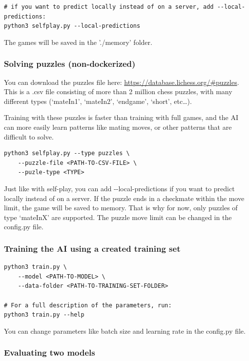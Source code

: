 \documentclass{article}
\begin{document}
\begin{verbatim}
# if you want to predict locally instead of on a server, add --local-predictions:
python3 selfplay.py --local-predictions
\end{verbatim}

The games will be saved in the './memory' folder.

\subsubsection{Solving puzzles (non-dockerized)}

You can download the puzzles file here: \url{https://database.lichess.org/#puzzles}.
This is a .csv file consisting of more than 2 million chess puzzles, 
with many different types (`mateIn1', `mateIn2', `endgame', `short', etc\dots).

Training with these puzzles is faster than training with full games, and the AI can
more easily learn patterns like mating moves, or other patterns that are difficult to solve. 

\begin{verbatim}
python3 selfplay.py --type puzzles \
    --puzzle-file <PATH-TO-CSV-FILE> \
    --puzle-type <TYPE>
\end{verbatim}

Just like with self-play, you can add -{}-local-predictions if you want to predict locally instead of on a server.
If the puzzle ends in a checkmate within the move limit, the game will be saved to memory. That is why for now, only puzzles of type `mateInX' are supported.
The puzzle move limit can be changed in the config.py file.

\subsubsection{Training the AI using a created training set}

\begin{verbatim}
python3 train.py \
    --model <PATH-TO-MODEL> \
    --data-folder <PATH-TO-TRAINING-SET-FOLDER>

# For a full description of the parameters, run:
python3 train.py --help
\end{verbatim}

You can change parameters like batch size and learning rate in the config.py file. 

\subsubsection{Evaluating two models}
\end{document}
